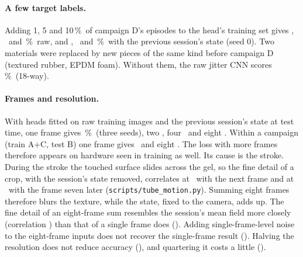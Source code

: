 \documentclass[10pt,twocolumn,letterpaper]{article}
\newcommand{\pct}{\,\%}
\begin{document}
\paragraph{A few target labels.} Adding 1, 5 and 10\pct\ of campaign D's episodes to the head's training set gives \SupFoneRawFSOne, \SupFoneRawFSFive\ and \SupFoneRawFSTen\pct\ raw, and \SupFonePrevFSOne, \SupFonePrevFSFive\ and \SupFonePrevFSTen\pct\ with the previous session's state (seed 0). Two materials were replaced by new pieces of the same kind before campaign D (textured rubber, EPDM foam). Without them, the raw jitter CNN scores \SupAugFoneRawEighteen\pct\ (18-way).
\paragraph{Frames and resolution.} With heads fitted on raw training images and the previous session's state at test time, one frame gives \SupFonePrevRawHeadAcc\pct\ (three seeds), two \SupFtwoPrevAcc, four \SupFfourPrevAcc\ and eight \SupPrevAcc. Within a campaign (train A+C, test B) one frame gives \HoldSupRawAcc\ and eight \HoldFeightRawAcc. The loss with more frames therefore appears on hardware seen in training as well. Its cause is the stroke. During the stroke the touched surface slides across the gel, so the fine detail of a crop, with the session's state removed, correlates at \TmotLagOne\ with the next frame and at \TmotLagSeven\ with the frame seven later (\texttt{scripts/tube\_motion.py}). Summing eight frames therefore blurs the texture, while the state, fixed to the camera, adds up. The fine detail of an eight-frame sum resembles the session's mean field more closely (correlation \TmotStateMean) than that of a single frame does (\TmotStateSingle). Adding single-frame-level noise to the eight-frame inputs does not recover the single-frame result (\NoiseFeightPrevAcc). Halving the resolution does not reduce accuracy (\SupFoneScHalfPrevSAcc), and quartering it costs a little (\SupFoneScQuarterPrevSAcc).
\end{document}

